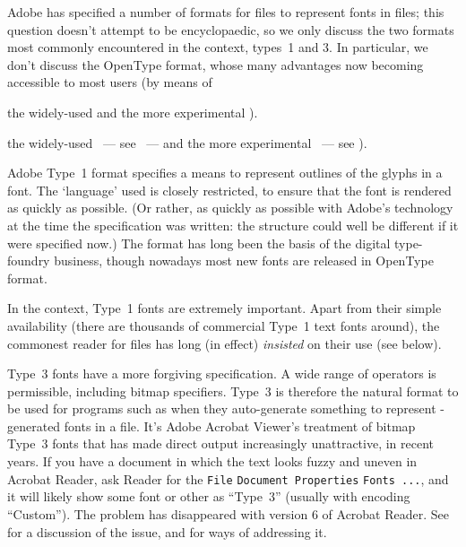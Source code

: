 
Adobe has specified a number of formats for files to represent fonts
in \PS{} files; this question doesn't attempt to be encyclopaedic, so
we only discuss the two formats most commonly encountered in the
\AllTeX{} context, types~1 and 3.  In particular, we don't discuss the
OpenType format, whose many advantages now becoming accessible to most
\AllTeX{} users (by means of
\begin{hyperversion}
  the widely-used  and the more experimental
  ).
\end{hyperversion}
\begin{flatversion}
  the widely-used \xetex{}~--- see ~--- and
  the more experimental \LuaTeX{}~--- see ).
\end{flatversion}

Adobe Type~1 format specifies a means to represent outlines of the glyphs
in a font.  The `language' used is closely restricted, to ensure that
the font is rendered as quickly as possible.  (Or rather, as quickly
as possible with Adobe's technology at the time the specification was
written: the structure could well be different if it were specified
now.)  The format has long been the basis of the digital type-foundry
business, though nowadays most new fonts are released in OpenType format.


In the \AllTeX{} context, Type~1 fonts are extremely important.  Apart
from their simple 
availability (there are thousands of commercial Type~1 text fonts around), the
commonest reader for  files has long (in effect) \emph{insisted} on
their use (see below).

Type~3 fonts have a more forgiving specification.  A wide range of
\PS{} operators is permissible, including bitmap specifiers.  Type~3
is therefore the natural format to be used for programs such as
 when they auto-generate something to represent
\MF{}-generated fonts in a \PS{} file.  It's Adobe Acrobat Viewer's
treatment of bitmap Type~3 fonts that has made direct \MF{} output
increasingly unattractive, in recent years.  If you have a 
document in which the text looks fuzzy and uneven in Acrobat Reader,
ask Reader for the \texttt{File}\arrowhyph{}%
\texttt{Document Properties}\arrowhyph{}%
\texttt{Fonts ...}, and it will likely show some font or other as
``Type~3'' (usually with encoding ``Custom'').  The problem has
disappeared with version 6 of Acrobat Reader.  See %
 for a discussion of
the issue, and for ways of addressing it.

